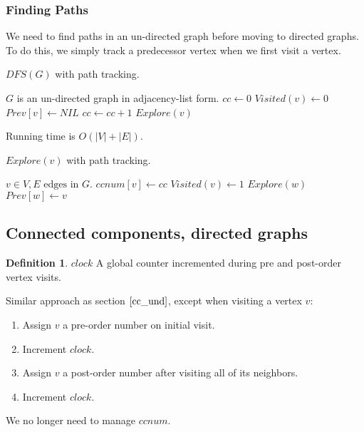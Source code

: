 \documentclass{article}
\theoremstyle{definition}
\newtheorem{definition}{Definition}[section]
\begin{document}
\subsubsection{Finding Paths}
We need to find paths in an un-directed graph before moving to directed graphs. To do this, we simply track a predecessor vertex when we first visit a vertex.

\begin{algorithm}
	\caption{$DFS(G)$ with path tracking.}
	\begin{algorithmic}[1]
		\REQUIRE $G$ is an un-directed graph in adjacency-list form.
		\STATE $cc \gets 0$
		\STATE $Visited(v) \gets 0$
		\STATE $Prev[v] \gets NIL$
		\ENDFOR
		\STATE $cc \gets cc + 1$
		\STATE $Explore(v)$
		\ENDIF
		\ENDFOR
	\end{algorithmic}
	Running time is $O(|V|+|E|)$.
\end{algorithm}

\begin{algorithm}[H]
	\caption{$Explore(v)$ with path tracking.}
	\begin{algorithmic}[1]
		\REQUIRE $v \in V, E \text{ edges in } G$.
		\STATE $ccnum[v] \gets cc$ 
		\STATE $Visited(v) \gets 1$
		\STATE $Explore(w)$
		\STATE $Prev[w] \gets v$
		\ENDIF
		\ENDFOR
	\end{algorithmic}
\end{algorithm}

\subsection{Connected components, directed graphs}
\begin{definition}{$clock$}
A global counter incremented during pre and post-order vertex visits.
\end{definition}

Similar approach as section $\ref{cc_und}$, except when visiting a vertex $v$: 
\begin{enumerate}
\item Assign $v$ a pre-order number on initial visit.
\item Increment $clock$.
\item Assign $v$ a post-order number after visiting all of its neighbors.
\item Increment $clock$.
\end{enumerate}
We no longer need to manage $ccnum$.
\end{document}
